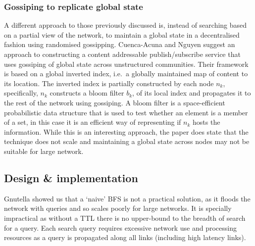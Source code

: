 \subsubsection{Gossiping to replicate global state}

A different approach to those previously discussed is, instead of searching based on a partial view of the network, to maintain a global state in a decentralised fashion using randomised gossipping. Cuenca-Acuna and Nguyen suggest an approach to constructing a content addressable publish/subscribe service that uses gossiping of global state across unstructured communities\cite{cuenca2002text}. Their framework is based on a global inverted index, i.e.\ a globally maintained map of content to its location. The inverted index is partially constructed by each node $n_k$, specifically, $n_k$ constructs a bloom filter $b_k$, of its local index and propagates it to the rest of the network using gossiping. A bloom filter is a space-efficient probabilistic data structure that is used to test whether an element is a member of a set, in this case it is an efficient way of representing if $n_k$ hosts the information. While this is an interesting approach, the paper does state that the technique does not scale and maintaining a global state across nodes may not be suitable for large network.\cite{zeinalipour2004ir}

\subsection{Design \& implementation}

Gnutella showed us that a `naive' BFS is not a practical solution, as it floods the network with queries and so scales poorly for large networks. It is specially impractical as without a TTL there is no upper-bound to the breadth of search for a query. Each search query requires excessive network use and processing resources as a query is propagated along all links (including high latency links)\cite{zeinalipour2004ir}.




